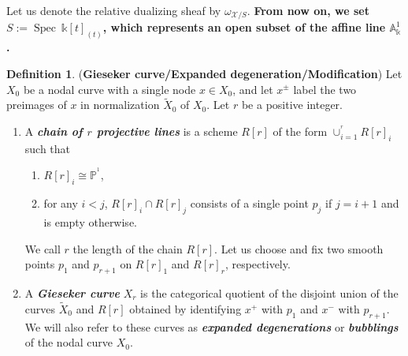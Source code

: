 \documentclass[11pt]{amsart}
\DeclareMathOperator{\Spec}{Spec}
\theoremstyle{plain}
\numberwithin{equation}{section}
\theoremstyle{definition}
\newtheorem{Def}{Definition}[section]
\theoremstyle{plain}
\begin{document}
Let us denote the relative dualizing sheaf by $\omega_{\mathcal X/S}$. \textbf{From now on, we set $S:=\Spec~ \mathbb k[t]_{(t)}$, which represents an open subset of the affine line $\mathbb A^1_{\mathbb k}$.} 

\smallskip

\begin{Def}\label{gis}(\textbf{Gieseker curve/Expanded degeneration/Modification}) 
Let $X_{0}$ be a nodal curve with a single node $x \in X_{0}$, and let $x^{\pm}$ label the two preimages of
$x$ in normalization $\widetilde{X}_{0}$ of $X_{0}$. Let $r$ be a positive integer.
\begin{enumerate}
\item A \emph{\bfseries chain of $r$ projective lines} is a scheme $R[r]$ of the form
$\cup_{i=1}^{^r} R[r]_{i}$ such that 
\begin{enumerate}
\item $R[r]_{i}\cong \mathbb{P}^{^1}$, 
\item for any $i<j$, $R[r]_{i}\cap R[r]_{j}$ consists of a single point $p_j$ if $j=i+1$ and is empty otherwise. 
\end{enumerate}

We call $r$ the length of the chain $R[r]$. Let us choose and fix two smooth points $p_1$ and $p_{r+1}$ on $R[r]_1$ and $R[r]_{r}$, respectively. 

\vspace{1cm}
\vspace{1cm}

\item A \emph{\bfseries Gieseker curve} $X_r$ is the categorical quotient of the disjoint union of the curves $\tilde{X}_0$ and $R[r]$ obtained by identifying $x^+$ with $p_1$ and $x^-$ with $p_{r+1}$. We will also refer to these curves as \emph{\bfseries expanded degenerations} or \emph{\bfseries bubblings} of the nodal curve $X_0$.
\end{enumerate}
\end{Def}
\end{document}
